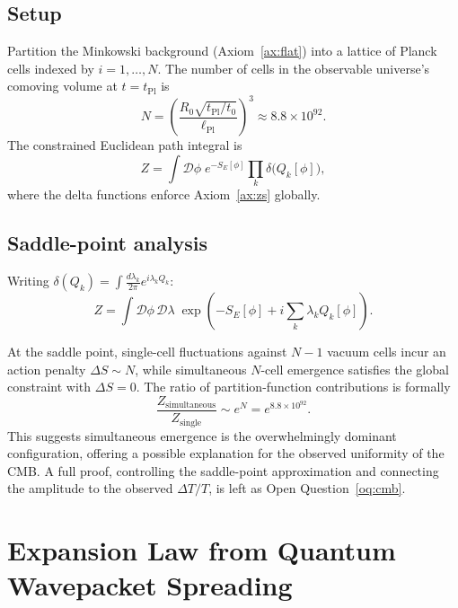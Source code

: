 \documentclass[12pt,a4paper]{article}
\theoremstyle{definition}
\theoremstyle{remark}
\newcommand{\tPl}{t_{\mathrm{Pl}}}
\newcommand{\lPl}{\ell_{\mathrm{Pl}}}
\begin{document}
\subsection{Setup}

Partition the Minkowski background (Axiom~\ref{ax:flat}) into a lattice of
Planck cells indexed by $i = 1,\ldots,N$.
The number of cells in the observable universe's comoving volume at
$t = \tPl$ is
\begin{equation}\label{eq:Ncells}
  N = \left(\frac{R_0\sqrt{\tPl/t_0}}{\lPl}\right)^3 \approx 8.8 \times 10^{92}.
\end{equation}
The constrained Euclidean path integral is
\begin{equation}\label{eq:PI}
  Z = \int \mathcal{D}\phi\;e^{-S_E[\phi]}
  \prod_k \delta\!\bigl(Q_k[\phi]\bigr),
\end{equation}
where the delta functions enforce Axiom~\ref{ax:zs} globally.

\subsection{Saddle-point analysis}

Writing $\delta(Q_k) = \int \frac{d\lambda_k}{2\pi}e^{i\lambda_k Q_k}$:
\begin{equation}\label{eq:PI_lambda}
  Z = \int \mathcal{D}\phi\,\mathcal{D}\lambda\;
  \exp\!\left(-S_E[\phi] + i\sum_k\lambda_k Q_k[\phi]\right).
\end{equation}

At the saddle point, single-cell fluctuations against $N-1$ vacuum cells
incur an action penalty $\Delta S \sim N$, while simultaneous $N$-cell
emergence satisfies the global constraint with $\Delta S = 0$.
The ratio of partition-function contributions is formally
\begin{equation}
  \frac{Z_{\mathrm{simultaneous}}}{Z_{\mathrm{single}}}
  \sim e^{N} = e^{8.8 \times 10^{92}}.
\end{equation}
This suggests simultaneous emergence is the overwhelmingly dominant
configuration, offering a possible explanation for the observed
uniformity of the CMB.
A full proof, controlling the saddle-point approximation and connecting
the amplitude to the observed $\Delta T/T$, is left as
Open Question~\ref{oq:cmb}.

\section{Expansion Law from Quantum Wavepacket Spreading}
\label{sec:expansion}
\end{document}
